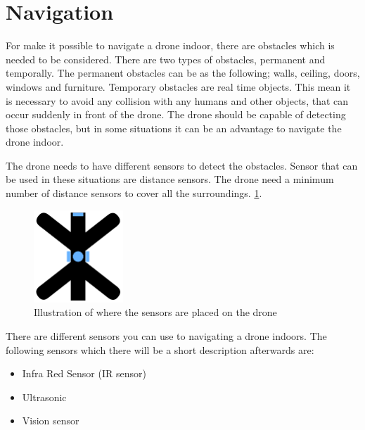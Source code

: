 \section{Navigation} \label{s:navi}
For make it possible to navigate a drone indoor, there are obstacles which is needed to be considered. There are two types of obstacles, permanent and temporally. The permanent obstacles can be as the following; walls, ceiling, doors, windows and furniture. Temporary obstacles are real time objects. This mean it is necessary to avoid any collision with any humans and other objects, that can occur suddenly in front of the drone. The drone should be capable of detecting those obstacles, but in some situations it can be an advantage to navigate the drone indoor. 
\newline

The drone needs to have different sensors to detect the obstacles. Sensor that can be used in these situations are distance sensors. The drone need a minimum number of distance sensors to cover all the surroundings. 
\ref{fig:drone_sensor}.
\begin{figure}[H]
    \centering
    \includegraphics[width=0.3\textwidth]{figures/Navigation/DroneIR.png}
    \caption{Illustration of where the sensors are placed on the drone}
    \label{fig:drone_sensor}
\end{figure}
There are different sensors you can use to navigating a drone indoors. The following sensors which there will be a short description afterwards are:
\begin{itemize}
    \item Infra Red Sensor (IR sensor)
    \item Ultrasonic
    \item Vision sensor  
\end{itemize}
